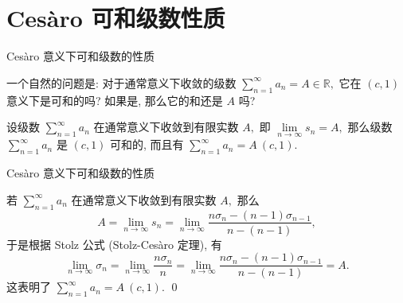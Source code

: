 
\section[性质]{Cesàro 可和级数性质}


\begin{frame}{Cesàro 意义下可和级数的性质}

一个自然的问题是: 对于通常意义下收敛的级数 $\sum\limits_{n=1}^{\infty} a_n = A \in \mathbb{R},$ 它在 $(c, 1)$ 意义下是可和的吗? 如果是, 那么它的和还是 $A$ 吗?

\pause
\vspace*{2em}

\begin{prop}
设级数 $\sum\limits_{n=1}^{\infty} a_n$ 在通常意义下收敛到有限实数 $A,$ 即 $\lim\limits_{n \to \infty} s_n = A,$ 那么级数 $\sum\limits_{n=1}^{\infty} a_n$ 是 $(c, 1)$ 可和的, 而且有 $\sum\limits_{n=1}^{\infty} a_n = A~(c, 1).$
\end{prop}

\end{frame}


\begin{frame}{Cesàro 意义下可和级数的性质}

\startproof[bg=yellow, fg=red]
若 $\sum\limits_{n=1}^{\infty} a_n$ 在通常意义下收敛到有限实数 $A,$ 那么
\[A = \lim\limits_{n \to \infty} s_n = \lim\limits_{n \to \infty} \dfrac{n\sigma_n - (n-1)\sigma_{n-1}}{n - (n-1)}, \]
于是根据 Stolz 公式 (Stolz-Cesàro 定理), 有
\[\lim\limits_{n \to \infty} \sigma_n = \lim\limits_{n \to \infty} \dfrac{n\sigma_n}{n} = \lim\limits_{n \to \infty} \dfrac{n\sigma_n - (n-1)\sigma_{n-1}}{n - (n-1)} = A.\]
这表明了 $\sum\limits_{n=1}^{\infty} a_n = A~(c, 1).$
\qed

\end{frame}


